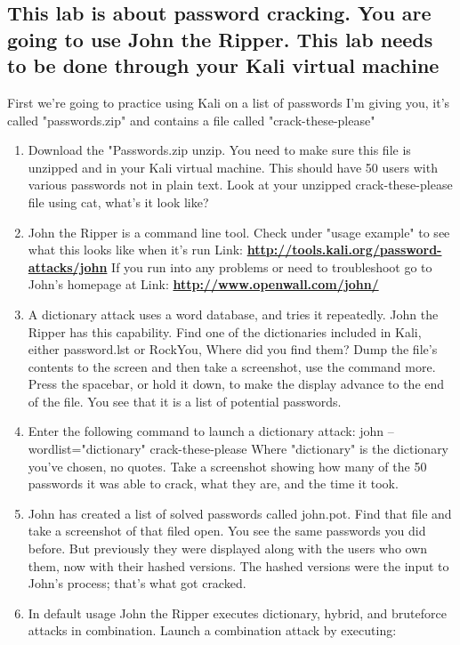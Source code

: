 \documentclass[12pt]{article}
\begin{document}
\subsection*{This lab is about password cracking. You are going to use John the Ripper. This lab needs to be done through your Kali virtual machine}
First we're going to practice using Kali on a list of passwords I'm giving you, it's called "passwords.zip" and contains a file called "crack-these-please"
    \begin{enumerate}
        \item Download the "Passwords.zip  unzip. You need to make sure this file is unzipped and in your Kali virtual machine.  This should have 50 users with various passwords not in plain text.  Look at your unzipped crack-these-please file using cat, what's it look like?
        \item John the Ripper is a command line tool.  Check under "usage example" to see what this looks like when it's run Link: \href{http://tools.kali.org/password-attacks/john}{\textbf{http://tools.kali.org/password-attacks/john}} If you run into any problems or need to troubleshoot go to John's homepage at Link: \href{http://www.openwall.com/john/}{\textbf{http://www.openwall.com/john/}}
        \item A dictionary attack uses a word database, and tries it repeatedly. John the Ripper has this capability. Find one of the dictionaries included in Kali, either password.lst or RockYou,  Where did you find them? Dump the file's contents to the screen and then take a screenshot, use the command more.
        Press the spacebar, or hold it down, to make the display advance to the end of the file. You see that it is a list of potential passwords.
        \item Enter the following command to launch a dictionary attack:
        john --wordlist="dictionary" crack-these-please
        Where "dictionary" is the dictionary you've chosen, no quotes.
        Take a screenshot showing how many of the 50 passwords it was able to crack, what they are, and the time it took.
        \item John has created a list of solved passwords called john.pot.  Find that file and take a screenshot of that filed open.
        You see the same passwords you did before. But previously they were displayed along with the users who own them, now with their hashed versions. The hashed versions were the input to John's process; that's what got cracked.
        \item In default usage John the Ripper executes dictionary, hybrid, and bruteforce attacks in combination. Launch a combination attack by executing:

\end{enumerate}
\end{document}
